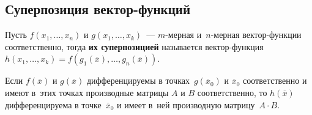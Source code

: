 \subsection{Суперпозиция вектор-функций}
Пусть $f(x_1, \ldots, x_n)$ и $g(x_1, \ldots, x_k)$~--- $m$-мерная и~$n$-мерная вектор-функции соответственно, тогда \textbf{их суперпозицией} называется вектор-функция~$h(x_1, \ldots, x_k) = f(g_1(\overline x), \ldots, g_n(\overline x))$.

\begin{theorem}
Если $f(\overline x)$ и $g(\overline x)$ дифференцируемы в точках~$g(\overline x_0)$ и $\overline x_0$ соответственно и имеют в~этих точках производные матрицы $A$ и $B$ соответственно, то $h(\overline x)$ дифференцируема в точке~$\overline x_0$ и имеет в~ней производную матрицу~$A \cdot B$.
\end{theorem}
